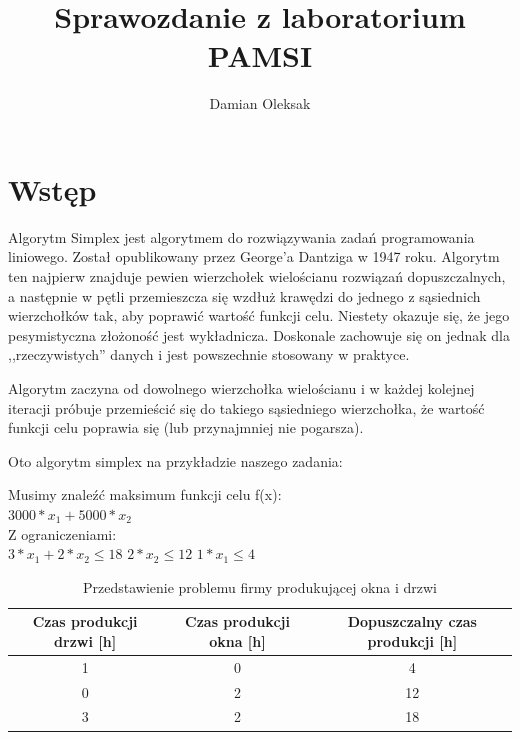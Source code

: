 \documentclass[12pt,a4paper]{article}
\title{Sprawozdanie z laboratorium PAMSI}
\author{Damian Oleksak}
\date{}
\begin{document}
\maketitle
\newpage

\section*{Wstęp}

Algorytm Simplex jest algorytmem do rozwiązywania zadań programowania liniowego. Został opublikowany przez George'a Dantziga w 1947 roku. Algorytm ten najpierw znajduje pewien wierzchołek wielościanu rozwiązań dopuszczalnych, a następnie w pętli przemieszcza się wzdłuż krawędzi do jednego z sąsiednich wierzchołków tak, aby poprawić wartość funkcji celu. Niestety okazuje się, że jego pesymistyczna złożoność jest wykładnicza. Doskonale zachowuje się on jednak dla ,,rzeczywistych'' danych i jest powszechnie stosowany w praktyce.
\newline

Algorytm zaczyna od dowolnego wierzchołka wielościanu i w każdej kolejnej iteracji próbuje przemieścić się do takiego sąsiedniego wierzchołka, że wartość funkcji celu poprawia się (lub przynajmniej nie pogarsza).\newline

Oto algorytm simplex na przykładzie naszego zadania:
\newline

Musimy znaleźć maksimum funkcji celu f(x):\newline \\
$ 3000 \ast x_{1} + 5000 \ast x_{2} $\newline \\
Z ograniczeniami:\newline \\
$ 3 \ast x_{1} + 2 \ast x_{2} \leq 18 $\newline
$ 2 \ast x_{2} \leq 12 $\newline
$ 1 \ast x_{1} \leq 4 $\newline


\begin{table}[h]
\caption{Przedstawienie problemu firmy produkującej okna i drzwi}
\label{tab.}
\centering
\begin{tabular}{|c|c|c|}
  \hline 
  Czas produkcji drzwi [h] & Czas produkcji okna [h] & Dopuszczalny czas produkcji [h]\\
  \hline
  1 & 0 & 4 \\
  \hline
  0 & 2 & 12 \\
  \hline
    3 & 2 & 18 \\
  \hline
\end{tabular} 
\end{table}
\end{document}
